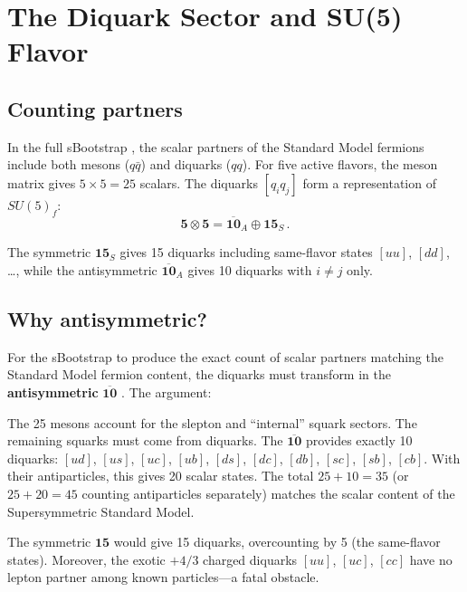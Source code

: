 \documentclass[12pt,a4paper]{article}
\begin{document}
\section{The Diquark Sector and SU(5) Flavor}
\label{sec:diquarks}

\subsection{Counting partners}

In the full sBootstrap \cite{Rivero2005}, the scalar partners of 
the Standard Model fermions include both mesons ($q\bar{q}$) and 
diquarks ($qq$). For five active flavors, the meson matrix gives 
$5 \times 5 = 25$ scalars. The diquarks $[q_i q_j]$ form a 
representation of $SU(5)_f$:
\begin{equation}
\mathbf{5} \otimes \mathbf{5} = \overline{\mathbf{10}}_A 
\oplus \mathbf{15}_S\,.
\end{equation}

The symmetric $\mathbf{15}_S$ gives 15 diquarks including 
same-flavor states $[uu]$, $[dd]$, \ldots, while the antisymmetric 
$\overline{\mathbf{10}}_A$ gives 10 diquarks with $i \neq j$ only.

\subsection{Why antisymmetric?}

For the sBootstrap to produce the exact count of scalar partners 
matching the Standard Model fermion content, the diquarks must 
transform in the \textbf{antisymmetric} $\overline{\mathbf{10}}$ 
\cite{Rivero2005}. The argument:

The 25 mesons account for the slepton and ``internal'' squark 
sectors. The remaining squarks must come from diquarks. The 
$\overline{\mathbf{10}}$ provides exactly 10 diquarks: $[ud]$, 
$[us]$, $[uc]$, $[ub]$, $[ds]$, $[dc]$, $[db]$, $[sc]$, $[sb]$, 
$[cb]$. With their antiparticles, this gives 20 scalar states. The 
total $25 + 10 = 35$ (or $25 + 20 = 45$ counting antiparticles 
separately) matches the scalar content of the Supersymmetric 
Standard Model.

The symmetric $\mathbf{15}$ would give 15 diquarks, overcounting 
by 5 (the same-flavor states). Moreover, the exotic $+4/3$ charged 
diquarks $[uu]$, $[uc]$, $[cc]$ have no lepton partner among known 
particles---a fatal obstacle.
\end{document}
